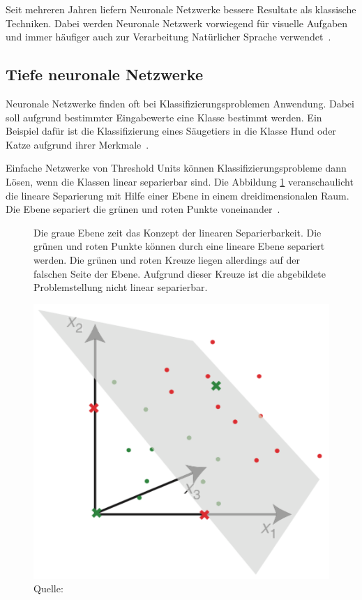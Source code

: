 Seit mehreren Jahren liefern Neuronale Netzwerke bessere Resultate als klassische Techniken. Dabei werden Neuronale Netzwerk vorwiegend für visuelle Aufgaben und immer häufiger auch zur Verarbeitung Natürlicher Sprache verwendet~\autocite{Olah2014b}.



\subsection{Tiefe neuronale Netzwerke}
\label{chap:deep-neural-nets}

Neuronale Netzwerke finden oft bei Klassifizierungsproblemen Anwendung. Dabei soll aufgrund bestimmter Eingabewerte eine Klasse bestimmt werden. Ein Beispiel dafür ist die Klassifizierung eines Säugetiers in die Klasse Hund oder Katze aufgrund ihrer Merkmale~\autocite{Krogh2008}.

Einfache Netzwerke von Threshold Units können Klassifizierungsprobleme dann Lösen, wenn die Klassen linear separierbar sind. Die Abbildung \ref{krogh:b} veranschaulicht die lineare Separierung mit Hilfe einer Ebene in einem dreidimensionalen Raum. Die Ebene separiert die grünen und roten Punkte voneinander~\autocite{Krogh2008}.

\begin{figure}[h]
    \captionsetup{width=.9\linewidth}
    \caption[Konzept der linearen Separierbarkeit]{Die graue Ebene zeit das Konzept der linearen Separierbarkeit. Die grünen und roten Punkte können durch eine lineare Ebene separiert werden. Die grünen und roten Kreuze liegen allerdings auf der falschen Seite der Ebene. Aufgrund dieser Kreuze ist die abgebildete Problemstellung nicht linear separierbar.}
    \label{krogh:b}
    \centering
    \includegraphics[width=0.4\linewidth]{graphics/krogh/krogh_plane.png}
    \caption*{Quelle: \textcite{Krogh2008}}
\end{figure}


